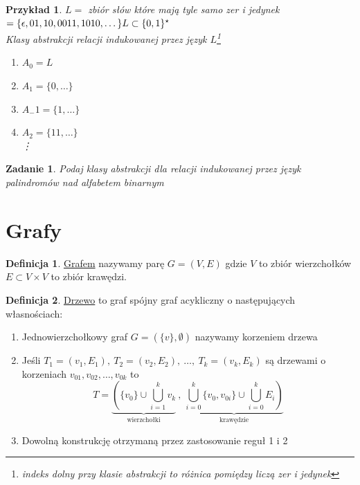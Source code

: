 \documentclass[12pt,a4paper]{article}
\newtheorem{przyklad}{Przykład}
\newtheorem{zad}{Zadanie}
\theoremstyle{definition}
\newtheorem{df}{Definicja}
\theoremstyle{remark}
\begin{document}
	\begin{przyklad}
		$L = $ zbiór słów które mają tyle samo zer i jedynek $ = \{\epsilon, 01, 10, 0011, 1010, \dots\}\\
		L \subset \{0, 1\}^\star$\\
		Klasy abstrakcji relacji indukowanej przez język $L$\footnote{indeks dolny przy klasie abstrakcji to różnica pomiędzy liczą zer i jedynek}
		\begin{enumerate}
			\item $A_0 = L$
			\item $A_1 = \{0, \dots \}$
			\item $A_-1 = \{1, \dots \}$
			\item $A_2 = \{11, \dots \}$\\
			\vdots
		\end{enumerate}
	\end{przyklad}
	\begin{zad}
		Podaj klasy abstrakcji dla relacji indukowanej przez język palindromów nad alfabetem binarnym
	\end{zad}

\section{Grafy}
	
	\begin{df}
		\href{http://pl.wikipedia.org/wiki/Graf_(matematyka)}{Grafem} nazywamy parę $G = (V, E)$ gdzie $V$ to zbiór wierzchołków 
		$E \subset V \times V$ to zbiór krawędzi.
	\end{df}	

	\begin{df}
		\href{http://pl.wikipedia.org/wiki/Drzewo_(matematyka)}{Drzewo} to graf spójny graf acykliczny o następujących własnościach:
		\begin{enumerate}
			\item Jednowierzchołkowy graf $G = (\{v\}, \emptyset)$ nazywamy korzeniem drzewa
			\item Jeśli $T_1 = (v_1, E_1), ~ T_2 = (v_2, E_2), ~\dots ,~ T_k = (v_k, E_k)$ są drzewami o korzeniach $v_{01}, v_{02}, \dots, v_{0k}$
			to $$T = \underbrace{ \left(\{v_0\} \cup \bigcup^k_{i=1}v_k \right. }_\text{wierzchołki} ~,~
					\underbrace{ \left. \bigcup_{i=0}^k \{v_0, v_{0i}\} \cup \bigcup_{i=0}^k E_i \right) }_\text{krawędzie}$$
			\item Dowolną konstrukcję otrzymaną przez zastosowanie reguł 1 i 2
		\end{enumerate}			
	\end{df}
	
\end{document}
